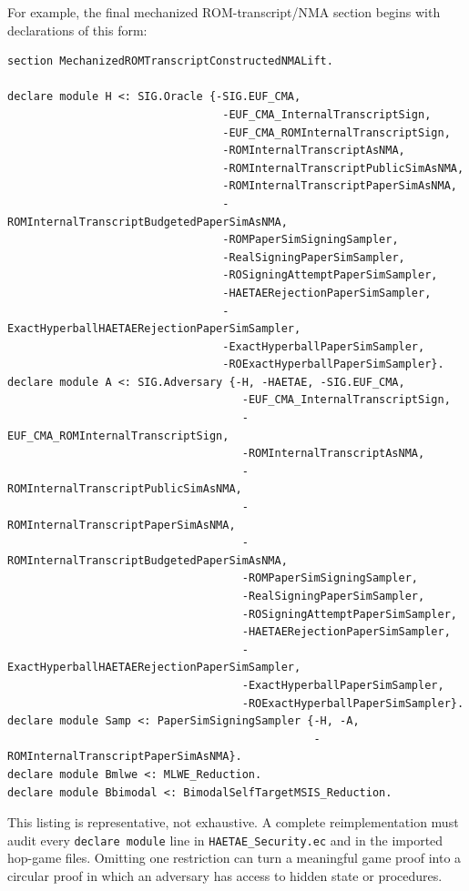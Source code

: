 \documentclass[11pt]{report}
\DeclareRobustCommand{\file}[1]{\ifmmode\text{\nolinkurl{#1}}\else\nolinkurl{#1}\fi}
\DeclareRobustCommand{\ec}[1]{\ifmmode\text{\nolinkurl{#1}}\else\nolinkurl{#1}\fi}
\theoremstyle{definition}
\theoremstyle{plain}
\begin{document}
For example, the final mechanized ROM-transcript/NMA section begins with
declarations of this form:

\begin{lstlisting}[language=EasyCrypt]
section MechanizedROMTranscriptConstructedNMALift.

declare module H <: SIG.Oracle {-SIG.EUF_CMA,
                                 -EUF_CMA_InternalTranscriptSign,
                                 -EUF_CMA_ROMInternalTranscriptSign,
                                 -ROMInternalTranscriptAsNMA,
                                 -ROMInternalTranscriptPublicSimAsNMA,
                                 -ROMInternalTranscriptPaperSimAsNMA,
                                 -ROMInternalTranscriptBudgetedPaperSimAsNMA,
                                 -ROMPaperSimSigningSampler,
                                 -RealSigningPaperSimSampler,
                                 -ROSigningAttemptPaperSimSampler,
                                 -HAETAERejectionPaperSimSampler,
                                 -ExactHyperballHAETAERejectionPaperSimSampler,
                                 -ExactHyperballPaperSimSampler,
                                 -ROExactHyperballPaperSimSampler}.
declare module A <: SIG.Adversary {-H, -HAETAE, -SIG.EUF_CMA,
                                    -EUF_CMA_InternalTranscriptSign,
                                    -EUF_CMA_ROMInternalTranscriptSign,
                                    -ROMInternalTranscriptAsNMA,
                                    -ROMInternalTranscriptPublicSimAsNMA,
                                    -ROMInternalTranscriptPaperSimAsNMA,
                                    -ROMInternalTranscriptBudgetedPaperSimAsNMA,
                                    -ROMPaperSimSigningSampler,
                                    -RealSigningPaperSimSampler,
                                    -ROSigningAttemptPaperSimSampler,
                                    -HAETAERejectionPaperSimSampler,
                                    -ExactHyperballHAETAERejectionPaperSimSampler,
                                    -ExactHyperballPaperSimSampler,
                                    -ROExactHyperballPaperSimSampler}.
declare module Samp <: PaperSimSigningSampler {-H, -A,
                                               -ROMInternalTranscriptPaperSimAsNMA}.
declare module Bmlwe <: MLWE_Reduction.
declare module Bbimodal <: BimodalSelfTargetMSIS_Reduction.
\end{lstlisting}

This listing is representative, not exhaustive.  A complete reimplementation
must audit every \ec{declare module} line in \file{HAETAE\_Security.ec} and in
the imported hop-game files.  Omitting one restriction can turn a meaningful
game proof into a circular proof in which an adversary has access to hidden
state or procedures.
\end{document}
